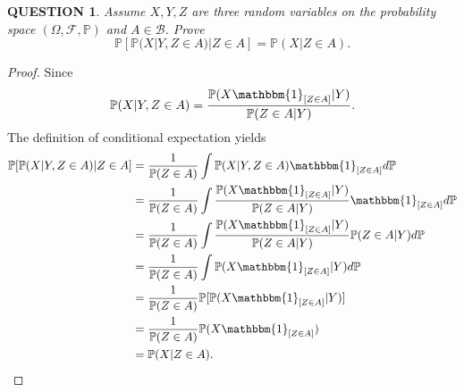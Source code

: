\documentclass[12pt]{article}
\renewcommand{\b}{\mathscr{B}}
\renewcommand{\(}{\left(}%
\renewcommand{\)}{\right)}%
\renewcommand{\[}{\left[}%
\renewcommand{\]}{\right]}%
\newcommand{\p}{\mathbb{P}}
\newcommand{\f}{\mathscr{F}}
\newtheorem{question}{QUESTION}[section]}
\newtheorem{proof}{Proof.}}
\begin{document}
  \begin{question}
  	Assume $X, Y, Z$ are three random variables on the probability space $(\Omega,\f,\p)$ and $A\in\b$. Prove
  	\begin{equation*}
  		\p[\p(X|Y,Z\in A)|Z\in A]=\p(X|Z\in A).
  	\end{equation*}
  \end{question}
  \begin{proof}
  	Since
  	\begin{equation*}
  		\p(X|Y,Z\in A)=\frac{\p(X\mathbbm{1}_{[Z\in A]}|Y)}{\p(Z\in A|Y)}.
  	\end{equation*}
  	The definition of conditional expectation yields
  	\begin{align*}
  		\p[\p(X|Y,Z\in A)|Z\in A]&=\frac{1}{\p(Z\in A)} \int  \p(X|Y,Z\in A)\mathbbm{1}_{[Z\in A]}d\p\\
  			&=\frac{1}{\p(Z\in A)} \int  \frac{\p(X\mathbbm{1}_{[Z\in A]}|Y)}{\p(Z\in A|Y)}\mathbbm{1}_{[Z\in A]}d\p\\
  			&=\frac{1}{\p(Z\in A)} \int  \frac{\p(X\mathbbm{1}_{[Z\in A]}|Y)}{\p(Z\in A|Y)}\p(Z\in A|Y)d\p\\
  			&=\frac{1}{\p(Z\in A)} \int  \p(X\mathbbm{1}_{[Z\in A]}|Y)d\p\\
  			&=\frac{1}{\p(Z\in A)} \p[  \p(X\mathbbm{1}_{[Z\in A]}|Y)]\\
  			&=\frac{1}{\p(Z\in A)} \p(X\mathbbm{1}_{[Z\in A]})\\
  			&=\p(X|Z\in A).
  	\end{align*}
  \end{proof}
  
\end{document}
